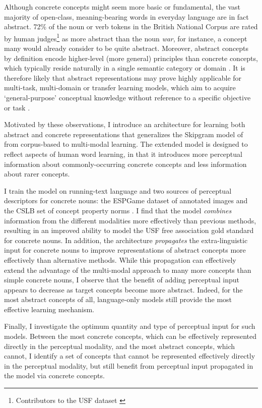 Although concrete concepts might seem more basic or fundamental, the vast majority of open-class, meaning-bearing words in everyday language are in fact abstract. 72\% of the noun or verb tokens in the British National Corpus \citep{leech1994claws4} are rated by human judges\footnote{Contributors to the USF dataset \citep{nelson2004university}} as more abstract than the noun \emph{war}, for instance, a concept many would already consider to be quite abstract. Moreover, abstract concepts by definition encode higher-level (more general) principles than concrete concepts, which typically reside naturally in a single semantic category or domain \citep{crutch2005abstract}. It is therefore likely that abstract representations may prove highly applicable for multi-task, multi-domain or transfer learning models, which aim to acquire `general-purpose' conceptual knowledge without reference to a specific objective or task \citep{collobert2008unified,mesnil2012unsupervised}. 

Motivated by these observations, I introduce an architecture for learning both abstract and concrete representations that generalizes the Skipgram model of \citep{mikolov2013efficient} from corpus-based  to multi-modal learning. The extended model is designed to reflect aspects of human word learning, in that it introduces more perceptual information about commonly-occurring concrete concepts and less information about rarer concepts. 

I train the model on running-text language and two sources of perceptual descriptors for concrete nouns: the ESPGame dataset of annotated images \citep{von2004labeling} and the CSLB set of concept property norms \citep{devereux2013centre}. I find that the model \emph{combines} information from the different modalities more effectively than previous methods, resulting in an improved ability to model the USF free association gold standard \citep{nelson2004university} for concrete nouns. In addition, the architecture  \emph{propagates} the extra-linguistic input for concrete nouns to improve representations of abstract concepts more effectively than alternative methods. While this propagation can effectively extend the advantage of the multi-modal approach to many more concepts than simple concrete nouns, I observe that the benefit of adding perceptual input appears to decrease as target concepts become more abstract. Indeed, for the most abstract concepts of all, language-only models still provide the most effective learning mechanism.  

Finally, I investigate the optimum quantity and type of perceptual input for such models. Between the most concrete concepts, which can be effectively represented directly in the perceptual modality, and the most abstract concepts, which cannot, I identify a set of concepts that cannot be represented effectively directly in the perceptual modality, but still benefit from perceptual input propagated in the model via concrete concepts. 

